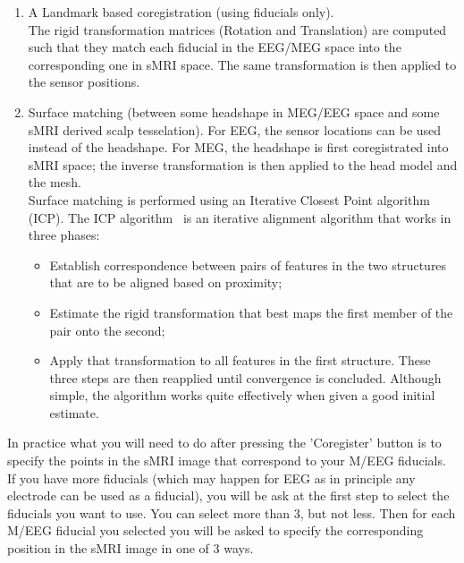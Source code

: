 \begin{enumerate}
    \item A Landmark based coregistration (using fiducials only).\\
    The rigid transformation matrices (Rotation and Translation) are computed such that
they match each fiducial in the EEG/MEG space into the corresponding one in sMRI space. The same
transformation is then applied to the sensor positions.
    \item Surface matching (between some headshape in MEG/EEG space and some sMRI derived scalp tesselation).
For EEG, the sensor locations can be used instead of the headshape. For MEG, the headshape is
first coregistrated into sMRI space; the inverse transformation is then applied to the head model
and the mesh.\\
Surface matching is performed using an Iterative Closest Point algorithm (ICP).
The ICP algorithm~\cite{Besl_McKay} is an iterative alignment algorithm that works in three phases:
\begin{itemize}
    \item Establish correspondence between pairs of features in the two structures that
    are to be aligned based on proximity;
    \item Estimate the rigid transformation that best maps the first member of the
     pair onto the second;
    \item Apply that transformation to all features in the first structure. These three
     steps are then reapplied until convergence is concluded.
Although simple, the algorithm works quite effectively when given a good initial estimate.
\end{itemize}
\end{enumerate}

In practice what you will need to do after pressing  the 'Coregister' button is to specify the points
in the sMRI image that correspond to your M/EEG fiducials. If you have more fiducials (which may happen
for EEG as in principle any electrode can be used as a fiducial), you will be ask at the first step to select
the fiducials you want to use. You can select more than 3, but not less. Then for each M/EEG fiducial you selected
you will be asked to specify the corresponding position in the sMRI image in one of 3 ways.


